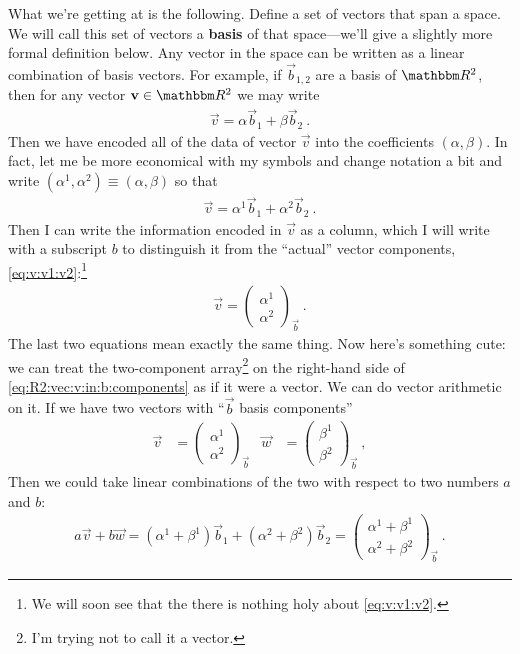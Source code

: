\documentclass[12pt]{article}
\begin{document}
What we're getting at is the following.  Define a set of vectors that span a space. We will call this set of vectors a \textbf{basis} of that space---we'll give a slightly more formal definition below. Any vector in the space can be written as a linear combination of basis vectors. For example, if $\vec{b}_{1,2}$ are a basis of $\RR ^2$, then for any vector $\vec{v}\in\RR ^2$ we may write
\begin{align}
    \vec{v} = \alpha \vec{b}_{1} + \beta \vec{b}_2 \ .
\end{align}
Then we have encoded all of the data of vector $\vec{v}$ into the coefficients $(\alpha, \beta)$. In fact, let me be more economical with my symbols and change notation a bit and write $(\alpha^1, \alpha^2) \equiv (\alpha,\beta)$ so that
\begin{align}
    \vec{v} = \alpha^1 \vec{b}_{1} + \alpha^2 \vec{b}_2 \ .
    \label{eq:R2:vec:v:in:b:components:lincomb}
\end{align}
Then I can write the information encoded in $\vec{v}$ as a column, which I will write with a subscript $b$ to distinguish it from the ``actual'' vector components, \eqref{eq:v:v1:v2}:\footnote{We will soon see that the there is nothing holy about \eqref{eq:v:v1:v2}.}
\begin{align}
    \vec{v} = 
    \begin{pmatrix}
        \alpha^1\\
        \alpha^2
    \end{pmatrix}_{\vec{b}} \ .
    \label{eq:R2:vec:v:in:b:components}
\end{align}
The last two equations mean exactly the same thing. Now here's something cute: we can treat the two-component array\footnote{I'm trying not to call it a vector.} on the right-hand side of \eqref{eq:R2:vec:v:in:b:components} as if it were a vector. We can do vector arithmetic on it. If we have two vectors with ``$\vec{b}$ basis components''
\begin{align}
    \vec{v}&=
    \begin{pmatrix}
        \alpha^1\\
        \alpha^2
    \end{pmatrix}_{\vec{b}} 
    &
    \vec{w}&=
    \begin{pmatrix}
        \beta^1\\
        \beta^2
    \end{pmatrix}_{\vec{b}}  \ ,
\end{align}
Then we could take linear combinations of the two with respect to two numbers $a$ and $b$:
\begin{align}
    a\vec{v} + b\vec{w} =
    (\alpha^1+\beta^1) \vec{b}_{1} + (\alpha^2+\beta^2) \vec{b}_2
    =
    \begin{pmatrix}
        \alpha^1 + \beta^1 \\
        \alpha^2 + \beta^2
    \end{pmatrix}_{\vec{b}} \ .
    \label{eq:linear:combination:in:b:basis}
\end{align}
\end{document}
